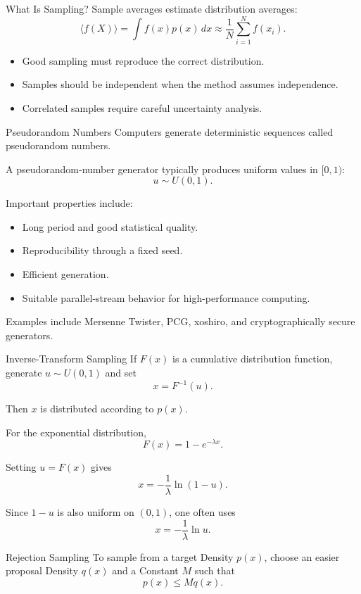 \documentclass[a4paper, 10pt, onepage]{elegantbook}
\begin{document}
{\begin{frame}{What Is Sampling?}
  Sample averages estimate distribution averages:
  \[
    \langle f(X)\rangle
    =
    \int f(x)p(x)\,dx
    \approx
    \frac{1}{N}\sum_{i=1}^{N}f(x_i).
  \]

  \begin{itemize}
    \item Good sampling must reproduce the correct distribution.
    \item Samples should be independent when the method assumes independence.
    \item Correlated samples require careful uncertainty analysis.
  \end{itemize}
\end{frame}

\begin{frame}{Pseudorandom Numbers}
  Computers generate deterministic sequences called pseudorandom numbers.

  A pseudorandom-number generator typically produces uniform values in \([0,1)\):
  \[
    u\sim U(0,1).
  \]

  Important properties include:
  \begin{itemize}
    \item Long period and good statistical quality.
    \item Reproducibility through a fixed seed.
    \item Efficient generation.
    \item Suitable parallel-stream behavior for high-performance computing.
  \end{itemize}

  Examples include Mersenne Twister, PCG, xoshiro, and cryptographically secure generators.
\end{frame}

\begin{frame}{Inverse-Transform Sampling}
  If \(F(x)\) is a cumulative distribution function, generate \(u\sim U(0,1)\) and set
  \[
    x=F^{-1}(u).
  \]

  Then \(x\) is distributed according to \(p(x)\).

  For the exponential distribution,
  \[
    F(x)=1-e^{-\lambda x}.
  \]

  Setting \(u=F(x)\) gives
  \[
    x=-\frac{1}{\lambda}\ln(1-u).
  \]

  Since \(1-u\) is also uniform on \((0,1)\), one often uses
  \[
    x=-\frac{1}{\lambda}\ln u.
  \]
\end{frame}

\begin{frame}{Rejection Sampling}
  To sample from a target Density \(p(x)\), choose an easier proposal Density \(q(x)\) and a Constant \(M\) such that
  \[
    p(x)\le Mq(x).
  \]


\end{frame}}
\end{document}
